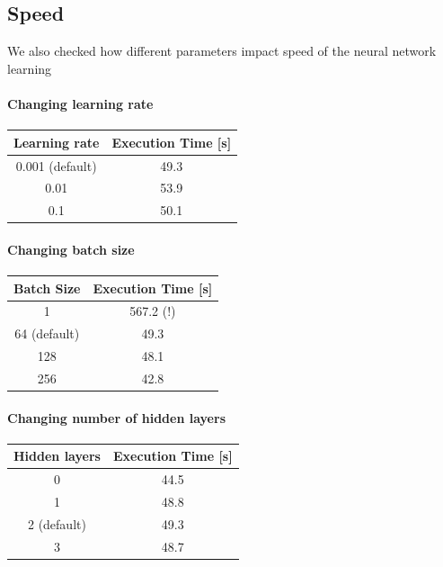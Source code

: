     \subsection{Speed}
    We also checked how different parameters impact speed of the neural network learning 

    \paragraph{Changing learning rate}
    \begin{center}
        \begin{tabular}{ | c | c |  }
            \hline
         Learning rate & Execution Time [s] \\ 
         \hline
         0.001 (default) & 49.3 \\  
         \hline
         0.01 & 53.9 \\    
         \hline
         0.1 & 50.1 \\    
         \hline
    \end{tabular}
    \end{center}

    \paragraph{Changing batch size}
    \begin{center}
        \begin{tabular}{ | c | c |  }
            \hline
         Batch Size & Execution Time [s] \\ 
         \hline
         1 & 567.2 (!) \\  
         \hline
         64 (default) & 49.3 \\    
         \hline
         128 & 48.1 \\    
         \hline
         256 & 42.8 \\    
         \hline
         
    \end{tabular}
    \end{center}

    \paragraph{Changing number of hidden layers}
    \begin{center}
        \begin{tabular}{ | c | c |  }
            \hline
         Hidden layers & Execution Time [s] \\ 
         \hline
         0 & 44.5 \\  
         \hline
         1 & 48.8 \\    
         \hline
         2 (default) & 49.3 \\    
         \hline
         3 & 48.7 \\    
         \hline
    \end{tabular}
    \end{center}

